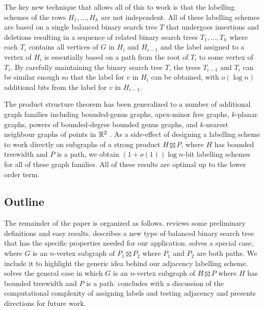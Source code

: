 \documentclass[kpfonts]{patmorin}
\begin{document}
The key new technique that allows all of this to work is that the labelling schemes of the rows $H_1,\ldots,H_h$ are not independent.  All of these labelling schemes are based on a single balanced binary search tree $T$ that undergoes insertions and deletions resulting in a sequence of related binary search trees $T_1,\ldots,T_h$ where each $T_i$ contains all vertices of $G$ in $H_{i}$ and $H_{i-1}$ and the label assigned to a vertex of $H_i$ is essentially based on a path from the root of $T_i$ to some vertex of $T_i$.  By carefully maintaining the binary search tree $T$, the trees $T_{i-1}$ and $T_{i}$ can be similar enough so that the label for $v$ in $H_i$ can be obtained, with $o(\log n)$ additional bits from the label for $v$ in $H_{i-1}$.

The product structure theorem has been generalized to a number of additional graph families including bounded-genus graphs, apex-minor free graphs, $k$-planar graphs, powers of bounded-degree bounded genus graphs, and $k$-nearest neighbour graphs of points in $\mathbb{R}^2$ \cite{dujmovic.joret.ea:planar,dujmovic.morin.ea:structure}. As a side-effect of designing a labelling scheme to work directly on subgraphs of a strong product $H\boxtimes P$, where $H$ has bounded treewidth and $P$ is a path, 
we obtain $(1+o(1))\log n$-bit labelling schemes for all of these graph families.  All of these results are optimal up to the lower order term.

\subsection{Outline}

The remainder of the paper is organized as follows.  reviews some preliminary definitions and easy results.   describes a new type of balanced binary search tree that has the specific properties needed for our application.  solves a special case, where $G$ is an $n$-vertex subgraph of $P_1\boxtimes P_2$ where $P_1$ and $P_2$ are both paths. We include it to highlight the generic idea behind our adjacency labelling scheme.  solves the general case in which $G$ is an $n$-vertex subgraph of $H\boxtimes P$ where $H$ has bounded treewidth and $P$ is a path.   concludes with a discussion of the computational complexity of assigning labels and testing adjacency and presents directions for future work.
\end{document}
